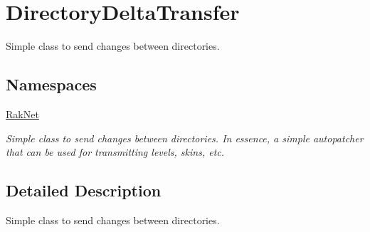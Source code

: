 \hypertarget{group___d_i_r_e_c_t_o_r_y___d_e_l_t_a___t_r_a_n_s_f_e_r___g_r_o_u_p}{\section{Directory\-Delta\-Transfer}
\label{group___d_i_r_e_c_t_o_r_y___d_e_l_t_a___t_r_a_n_s_f_e_r___g_r_o_u_p}
}


Simple class to send changes between directories.  


\subsection*{Namespaces}
\begin{DoxyCompactItemize}
\item 
\hyperlink{namespace_rak_net}{Rak\-Net}
\begin{DoxyCompactList}\small\item\em Simple class to send changes between directories. In essence, a simple autopatcher that can be used for transmitting levels, skins, etc. \end{DoxyCompactList}\end{DoxyCompactItemize}


\subsection{Detailed Description}
Simple class to send changes between directories. 